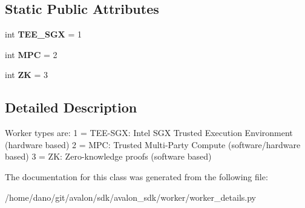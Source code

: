 \subsection*{Static Public Attributes}
\begin{DoxyCompactItemize}
\item 
\mbox{\label{classavalon__sdk_1_1worker_1_1worker__details_1_1WorkerType_a21ad9ccb527fd89159c10ab6ec37ab43}} 
int {\bfseries T\+E\+E\+\_\+\+S\+GX} = 1
\item 
\mbox{\label{classavalon__sdk_1_1worker_1_1worker__details_1_1WorkerType_acbae926bd9cdc6c91d05470e258d02f3}} 
int {\bfseries M\+PC} = 2
\item 
\mbox{\label{classavalon__sdk_1_1worker_1_1worker__details_1_1WorkerType_af299463debb301f1e6985eb2a8ea1a38}} 
int {\bfseries ZK} = 3
\end{DoxyCompactItemize}


\subsection{Detailed Description}
\begin{DoxyVerb}Worker types are:
1 = TEE-SGX: Intel SGX Trusted Execution Environment (hardware based)
2 = MPC: Trusted Multi-Party Compute (software/hardware based)
3 = ZK: Zero-knowledge proofs (software based)
\end{DoxyVerb}
 

The documentation for this class was generated from the following file\+:\begin{DoxyCompactItemize}
\item 
/home/dano/git/avalon/sdk/avalon\+\_\+sdk/worker/worker\+\_\+details.\+py\end{DoxyCompactItemize}
